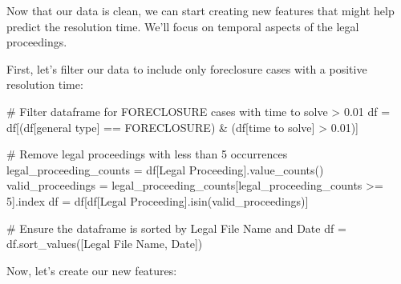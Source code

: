 \documentclass[
  letterpaper,
  DIV=11,
  numbers=noendperiod]{scrartcl}
\newenvironment{Shaded}{\begin{snugshade}}{\end{snugshade}}
\newcommand{\CommentTok}[1]{\textcolor[rgb]{0.37,0.37,0.37}{#1}}
\newcommand{\DecValTok}[1]{\textcolor[rgb]{0.68,0.00,0.00}{#1}}
\newcommand{\FloatTok}[1]{\textcolor[rgb]{0.68,0.00,0.00}{#1}}
\newcommand{\NormalTok}[1]{\textcolor[rgb]{0.00,0.23,0.31}{#1}}
\newcommand{\OperatorTok}[1]{\textcolor[rgb]{0.37,0.37,0.37}{#1}}
\newcommand{\StringTok}[1]{\textcolor[rgb]{0.13,0.47,0.30}{#1}}
\begin{document}
Now that our data is clean, we can start creating new features that
might help predict the resolution time. We'll focus on temporal aspects
of the legal proceedings.

First, let's filter our data to include only foreclosure cases with a
positive resolution time:

\begin{Shaded}
\begin{Highlighting}[]
\CommentTok{\# Filter dataframe for FORECLOSURE cases with time to solve \textgreater{} 0.01}
\NormalTok{df }\OperatorTok{=}\NormalTok{ df[(df[}\StringTok{\textquotesingle{}general type\textquotesingle{}}\NormalTok{] }\OperatorTok{==} \StringTok{\textquotesingle{}FORECLOSURE\textquotesingle{}}\NormalTok{) }\OperatorTok{\&}\NormalTok{ (df[}\StringTok{\textquotesingle{}time to solve\textquotesingle{}}\NormalTok{] }\OperatorTok{\textgreater{}} \FloatTok{0.01}\NormalTok{)]}

\CommentTok{\# Remove legal proceedings with less than 5 occurrences}
\NormalTok{legal\_proceeding\_counts }\OperatorTok{=}\NormalTok{ df[}\StringTok{\textquotesingle{}Legal Proceeding\textquotesingle{}}\NormalTok{].value\_counts()}
\NormalTok{valid\_proceedings }\OperatorTok{=}\NormalTok{ legal\_proceeding\_counts[legal\_proceeding\_counts }\OperatorTok{\textgreater{}=} \DecValTok{5}\NormalTok{].index}
\NormalTok{df }\OperatorTok{=}\NormalTok{ df[df[}\StringTok{\textquotesingle{}Legal Proceeding\textquotesingle{}}\NormalTok{].isin(valid\_proceedings)]}

\CommentTok{\# Ensure the dataframe is sorted by Legal File Name and Date}
\NormalTok{df }\OperatorTok{=}\NormalTok{ df.sort\_values([}\StringTok{\textquotesingle{}Legal File Name\textquotesingle{}}\NormalTok{, }\StringTok{\textquotesingle{}Date\textquotesingle{}}\NormalTok{])}
\end{Highlighting}
\end{Shaded}

Now, let's create our new features:
\end{document}
